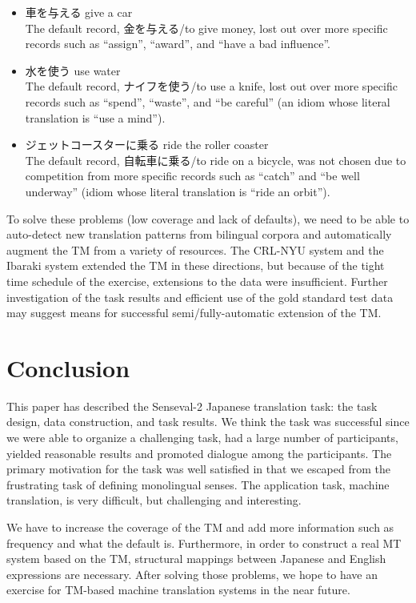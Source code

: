 \begin{itemize}
\item 車を与える give a car \\
  The default record, 金を与える/to give money, lost out over more
  specific records such as ``assign'', ``award'',  and  ``have a bad
  influence''.
  
\item 水を使う use water \\
  The default record, ナイフを使う/to use a knife, lost out over more
  specific records such as ``spend'', ``waste'', and ``be
  careful'' (an idiom whose literal translation is ``use a mind'').
  
\item ジェットコースターに乗る ride the roller coaster \\
  The default record, 自転車に乗る/to ride on a bicycle, was not chosen
  due to competition from more specific records such as ``catch'' and
  ``be well underway'' (idiom whose literal translation is ``ride an
  orbit'').
\end{itemize}

To solve these problems (low coverage and lack of defaults), we need to
be able to auto-detect new translation patterns from bilingual corpora
and automatically augment the TM from a variety of resources.  The
CRL-NYU system and the Ibaraki system extended the TM in these
directions, but because of the tight time schedule of the exercise,
extensions to the data were insufficient.  Further investigation of the
task results and efficient use of the gold standard test data may
suggest means for successful semi/fully-automatic extension of the TM.


\section{Conclusion}

This paper has described the {\sc Senseval-2} Japanese translation
task: the task design, data construction, and task results.  We think
the task was successful since we were able to organize a challenging
task, had a large number of participants, yielded reasonable results and
promoted dialogue among the participants.  The primary motivation for
the task was well satisfied in that we escaped from the frustrating task
of defining monolingual senses.  The application task, machine
translation, is very difficult, but challenging and interesting.

We have to increase the coverage of the TM and add more information such
as frequency and what the default is.  Furthermore, in order to
construct a real MT system based on the TM, structural mappings between
Japanese and English expressions are necessary.  After solving those
problems, we hope to have an exercise for TM-based machine translation
systems in the near future.


